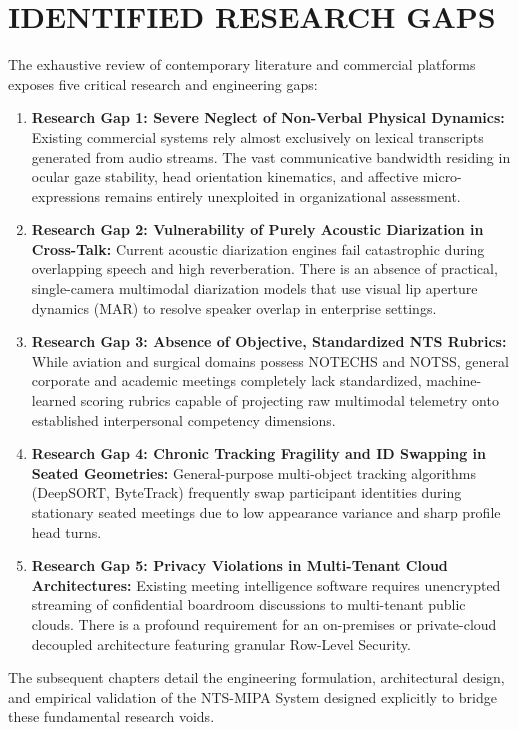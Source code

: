 \documentclass[12pt,a4paper,oneside]{report}
\begin{document}
\section{IDENTIFIED RESEARCH GAPS}
The exhaustive review of contemporary literature and commercial platforms exposes five critical research and engineering gaps:
\begin{enumerate}
    \item \textbf{Research Gap 1: Severe Neglect of Non-Verbal Physical Dynamics:} Existing commercial systems rely almost exclusively on lexical transcripts generated from audio streams. The vast communicative bandwidth residing in ocular gaze stability, head orientation kinematics, and affective micro-expressions remains entirely unexploited in organizational assessment.
    \item \textbf{Research Gap 2: Vulnerability of Purely Acoustic Diarization in Cross-Talk:} Current acoustic diarization engines fail catastrophic during overlapping speech and high reverberation. There is an absence of practical, single-camera multimodal diarization models that use visual lip aperture dynamics (MAR) to resolve speaker overlap in enterprise settings.
    \item \textbf{Research Gap 3: Absence of Objective, Standardized NTS Rubrics:} While aviation and surgical domains possess NOTECHS and NOTSS, general corporate and academic meetings completely lack standardized, machine-learned scoring rubrics capable of projecting raw multimodal telemetry onto established interpersonal competency dimensions.
    \item \textbf{Research Gap 4: Chronic Tracking Fragility and ID Swapping in Seated Geometries:} General-purpose multi-object tracking algorithms (DeepSORT, ByteTrack) frequently swap participant identities during stationary seated meetings due to low appearance variance and sharp profile head turns.
    \item \textbf{Research Gap 5: Privacy Violations in Multi-Tenant Cloud Architectures:} Existing meeting intelligence software requires unencrypted streaming of confidential boardroom discussions to multi-tenant public clouds. There is a profound requirement for an on-premises or private-cloud decoupled architecture featuring granular Row-Level Security.
\end{enumerate}

The subsequent chapters detail the engineering formulation, architectural design, and empirical validation of the NTS-MIPA System designed explicitly to bridge these fundamental research voids.
\end{document}
